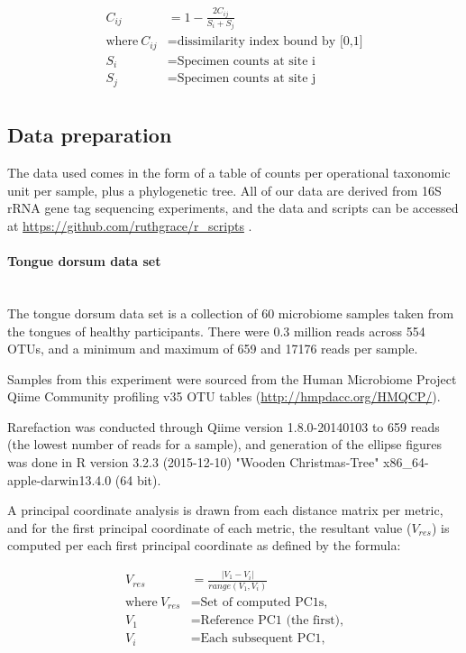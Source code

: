 \documentclass[10pt,letterpaper]{article}
\begin{document}
\begin{align*}
C_{ij} &= 1 - \frac{2C_{ij}}{S_{i} + S_{j}} \\
\text{where}~C_{ij}&= \text{dissimilarity index bound by [0,1]} \\
  S_{i} &= \text{Specimen counts at site i} \\
  S_{j} &= \text{Specimen counts at site j} \\
\end{align*}

\subsection{Data preparation}
The data used comes in the form of a table of counts per operational taxonomic unit per sample, plus a phylogenetic tree. All of our data are derived from 16S rRNA gene tag sequencing experiments, and the data and scripts can be accessed at \url{https://github.com/ruthgrace/r_scripts} \cite{r_scripts}.

\paragraph{Tongue dorsum data set}\mbox{}\\
The tongue dorsum data set is a collection of 60 microbiome samples taken from the tongues of healthy participants. There were 0.3 million reads across 554 OTUs, and a minimum and maximum of 659 and 17176 reads per sample.

Samples from this experiment were sourced from the Human Microbiome Project \cite{turnbaugh2007human} Qiime Community profiling v35 OTU tables (\url{http://hmpdacc.org/HMQCP/}).

Rarefaction was conducted through Qiime version 1.8.0-20140103 to 659 reads (the lowest number of reads for a sample), and generation of the ellipse figures was done in R version 3.2.3 (2015-12-10) "Wooden Christmas-Tree" x86\_64-apple-darwin13.4.0 (64 bit).

A principal coordinate analysis is drawn from each distance matrix per metric, and for the first principal coordinate of each metric, the resultant value ($V_{res}$) is computed per each first principal coordinate as defined by the formula:

\begin{align*}
  V_{res} &=\frac{|V_1 - V_i|}{range(V_1, V_i)} \\
  \text{where}~V_{res}&= \text{Set of computed PC1s,} \\
  V_1 &= \text{Reference PC1 (the first),} \\
  V_i &= \text{Each subsequent PC1,} \\
\end{align*}
\end{document}
